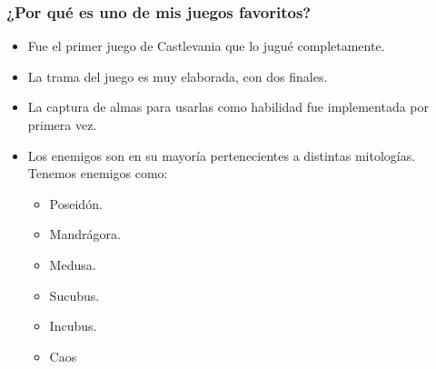 \subsubsection{¿Por qué es uno de mis juegos favoritos?}
\begin{itemize}
	\item Fue el primer juego de Castlevania que lo jugué completamente.
	\item La trama del juego es muy elaborada, con dos finales.
	\item La captura de almas para usarlas como habilidad fue implementada por primera vez.
	\item Los enemigos son en su mayoría pertenecientes a distintas mitologías. Tenemos enemigos como:
		\begin{itemize}
			\item Poseidón.
			\item Mandrágora.
			\item Medusa.
			\item Sucubus.
			\item Incubus.
			\item Caos
		\end{itemize}	
\end{itemize}
